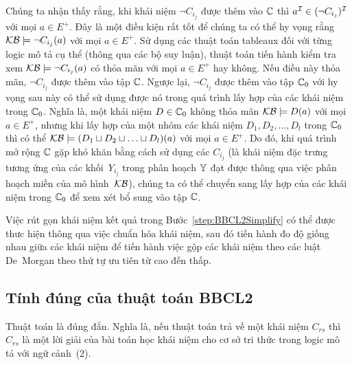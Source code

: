 Chúng ta nhận thấy rằng, khi khái niệm $\neg C_{i_j}$ được thêm vào $\mathbb{C}$ thì $a^{\mathcal{I}} \in (\neg C_{i_j})^{\mathcal{I}}$ với mọi $a \in E^+$. Đây là một điều kiện rất tốt để chúng ta có thể hy vọng rằng $\mathcal{KB} \models \neg C_{i_j}(a)$ với mọi $a \in E^+$. Sử dụng các thuật toán tableaux đối với từng logic mô tả cụ thể (thông qua các bộ suy luận), thuật toán \BBCLearn tiến hành kiểm tra xem $\mathcal{KB} \models \neg C_{i_j}(a)$ có thỏa mãn với mọi $a \in E^+$ hay không. Nếu điều này thỏa mãn, $\neg C_{i_j}$ được thêm vào tập $\mathbb{C}$. Ngược lại, $\neg C_{i_j}$ được thêm vào tập $\mathbb{C}_0$ với hy vọng sau này có thể sử dụng được nó trong quá trình lấy hợp của các khái niệm trong $\mathbb{C}_0$. Nghĩa là, một khái niệm $D \in \mathbb{C}_0$ không thỏa mãn $\mathcal{KB} \models D(a)$ với mọi $a \in E^+$, nhưng khi lấy hợp của một nhóm các khái niệm $D_1, D_2, \ldots, D_l$ trong $\mathbb{C}_0$ thì có thể $\mathcal{KB} \models (D_1 \sqcup D_2 \sqcup \ldots \sqcup D_l)(a)$ với mọi $a \in E^+$.
Do đó, khi quá trình mở rộng $\mathbb{C}$ gặp khó khăn bằng cách sử dụng các $C_{i_j}$ (là khái niệm đặc trưng tương ứng của các khối~$Y_{i_j}$ trong phân hoạch $\mathbb{Y}$ đạt được thông qua việc phân hoạch miền của mô hình~$\mathcal{KB}$), chúng ta có thể chuyển sang lấy hợp của các khái niệm trong $\mathbb{C}_0$ để xem xét bổ sung vào tập $\mathbb{C}$.

Việc rút gọn khái niệm kết quả trong Bước~\ref{step:BBCL2Simplify} có thể được thưc hiện thông qua việc chuẩn hóa khái niệm, sau đó tiến hành đo độ giống nhau giữa các khái niệm để tiến hành việc gộp các khái niệm theo các luật De~Morgan theo thứ tự ưu tiên từ cao đến thấp.

\subsection{Tính đúng của thuật toán BBCL2}

\begin{Proposition}
	Thuật toán \BBCLearnS là đúng đắn. Nghĩa là, nếu thuật toán \BBCLearnS trả về một khái niệm $C_{rs}$ thì $C_{rs}$ là một lời giải của bài toán học khái niệm cho cơ sở tri thức trong logic mô tả với ngữ cảnh~(2).
\end{Proposition}

